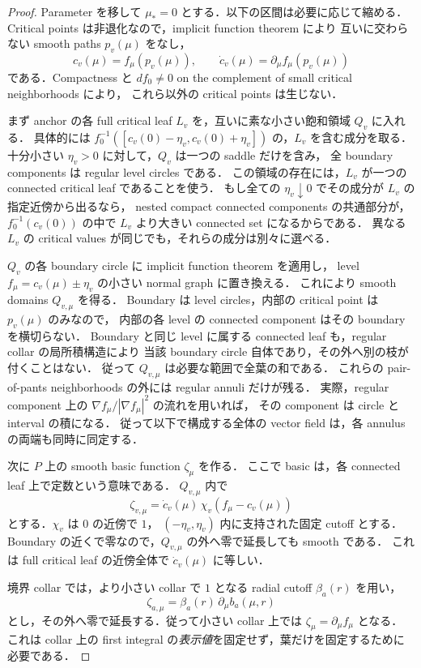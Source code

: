 \begin{proof}
Parameter を移して $\mu_*=0$ とする．以下の区間は必要に応じて縮める．
Critical points は非退化なので，implicit function theorem により
互いに交わらない smooth paths $p_v(\mu)$ をなし，
\[
 c_v(\mu)=f_\mu(p_v(\mu)),\qquad
 \dot c_v(\mu)=\partial_\mu f_\mu(p_v(\mu))
\]
である．Compactness と $df_0\ne0$ on the complement of small critical neighborhoods により，
これら以外の critical points は生じない．

まず anchor の各 full critical leaf $L_v$ を，互いに素な小さい飽和領域 $Q_v$ に入れる．
具体的には $f_0^{-1}([c_v(0)-\eta_v,c_v(0)+\eta_v])$ の，$L_v$ を含む成分を取る．
十分小さい $\eta_v>0$ に対して，$Q_v$ は一つの saddle だけを含み，
全 boundary components は regular level circles である．
この領域の存在には，$L_v$ が一つの connected critical leaf であることを使う．
もし全ての $\eta_v\downarrow0$ でその成分が $L_v$ の指定近傍から出るなら，
nested compact connected components の共通部分が，$f_0^{-1}(c_v(0))$ の中で
$L_v$ より大きい connected set になるからである．
異なる $L_v$ の critical values が同じでも，それらの成分は別々に選べる．

$Q_v$ の各 boundary circle に implicit function theorem を適用し，
level $f_\mu=c_v(\mu)\pm\eta_v$ の小さい normal graph に置き換える．
これにより smooth domains $Q_{v,\mu}$ を得る．
Boundary は level circles，内部の critical point は $p_v(\mu)$ のみなので，
内部の各 level の connected component はその boundary を横切らない．
Boundary と同じ level に属する connected leaf も，regular collar の局所積構造により
当該 boundary circle 自体であり，その外へ別の枝が付くことはない．
従って $Q_{v,\mu}$ は必要な範囲で全葉の和である．
これらの pair-of-pants neighborhoods の外には regular annuli だけが残る．
実際，regular component 上の $\nabla f_\mu/|\nabla f_\mu|^2$ の流れを用いれば，
その component は circle と interval の積になる．
従って以下で構成する全体の vector field は，各 annulus の両端も同時に同定する．

次に $P$ 上の smooth basic function $\zeta_\mu$ を作る．
ここで basic は，各 connected leaf 上で定数という意味である．
$Q_{v,\mu}$ 内で
\[
 \zeta_{v,\mu}
 =\dot c_v(\mu)\,\chi_v(f_\mu-c_v(\mu))
\]
とする．$\chi_v$ は $0$ の近傍で $1$，
$(-\eta_v,\eta_v)$ 内に支持された固定 cutoff とする．
Boundary の近くで零なので，$Q_{v,\mu}$ の外へ零で延長しても smooth である．
これは full critical leaf の近傍全体で $\dot c_v(\mu)$ に等しい．

境界 collar では，より小さい collar で $1$ となる radial cutoff $\beta_a(r)$ を用い，
\[
 \zeta_{a,\mu}=\beta_a(r)\,\partial_\mu b_a(\mu,r)
\]
とし，その外へ零で延長する．従って小さい collar 上では
$\zeta_\mu=\partial_\mu f_\mu$ となる．
これは collar 上の first integral の\emph{表示値}を固定せず，葉だけを固定するために必要である．


\end{proof}
